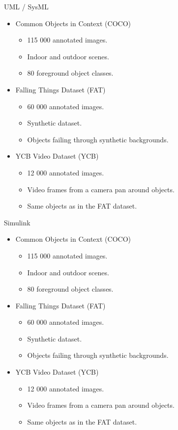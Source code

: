 \documentclass[18pt]{beamer}
\begin{document}
\begin{frame}{UML / SysML}
\begin{itemize}
	\item Common Objects in Context (COCO)
	\begin{itemize}
		\item 115 000 annotated images.
		\item Indoor and outdoor scenes.
		\item 80 foreground object classes.
	\end{itemize}
	\item Falling Things Dataset (FAT)
	\begin{itemize}
		\item 60 000 annotated images.
		\item Synthetic dataset.
		\item Objects failing through synthetic backgrounds.
	\end{itemize}
	\item YCB Video Dataset (YCB)
	\begin{itemize}
		\item 12 000 annotated images.
		\item Video frames from a camera pan around objects.
		\item Same objects as in the FAT dataset.
	\end{itemize}
\end{itemize}
\end{frame}

\begin{frame}{Simulink}
\begin{itemize}
	\item Common Objects in Context (COCO)
	\begin{itemize}
		\item 115 000 annotated images.
		\item Indoor and outdoor scenes.
		\item 80 foreground object classes.
	\end{itemize}
	\item Falling Things Dataset (FAT)
	\begin{itemize}
		\item 60 000 annotated images.
		\item Synthetic dataset.
		\item Objects failing through synthetic backgrounds.
	\end{itemize}
	\item YCB Video Dataset (YCB)
	\begin{itemize}
		\item 12 000 annotated images.
		\item Video frames from a camera pan around objects.
		\item Same objects as in the FAT dataset.
	\end{itemize}
\end{itemize}
\end{frame}
\end{document}
